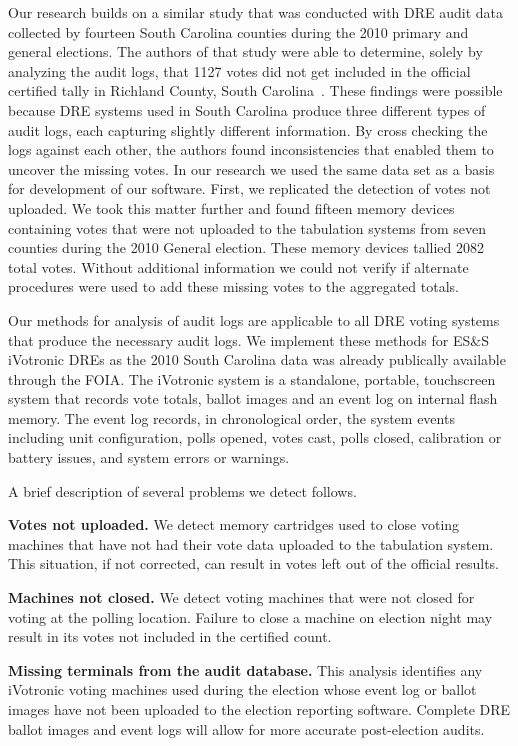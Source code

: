 Our research builds on a similar study that was conducted with DRE audit data collected by fourteen South Carolina counties during the 2010 primary and general elections.  The authors of that study were able to determine, solely by analyzing the audit logs, that 1127 votes did not get included in the official certified tally in Richland County, South Carolina~\cite{Buell2011}. These findings were possible because DRE systems used in South Carolina produce three different types of audit logs, each capturing slightly different information. By cross checking the logs against each other, the authors found inconsistencies that enabled them to uncover the missing votes. In our research we used the same data set as a basis for development of our software. First, we replicated the detection of votes not uploaded. We took this matter further and found fifteen memory devices containing votes that were not uploaded to the tabulation systems from seven counties during the 2010 General election. These memory devices tallied 2082 total votes. Without additional information we could not verify if alternate procedures were used to add these missing votes to the aggregated totals. 

Our methods for analysis of audit logs are applicable to all DRE voting systems  that produce the necessary audit logs. We implement these methods for ES\&S iVotronic DREs as the 2010 South Carolina data was already publically available through the FOIA. The iVotronic system is a standalone, portable, touchscreen system that records vote totals, ballot images and an event log on internal flash memory. The event log records, in chronological order, the system events including unit configuration, polls opened, votes cast, polls closed, calibration or battery issues, and system errors or warnings. 

A brief description of several problems we detect follows.

\textbf{Votes not uploaded.} We detect  memory cartridges used to close voting machines that have not had their vote data uploaded to the tabulation system. This situation, if not corrected, can result in votes left out of the official results.

\textbf{Machines not closed.} We detect voting machines that were not closed for voting at the polling location. Failure to close a machine on election night may result in its votes not included in the certified count.

\textbf{Missing terminals from the audit database.} This analysis identifies any iVotronic voting machines used during the election whose event log or ballot images have not been uploaded to the election reporting software. Complete DRE ballot images and event logs will allow for more accurate post-election audits.

